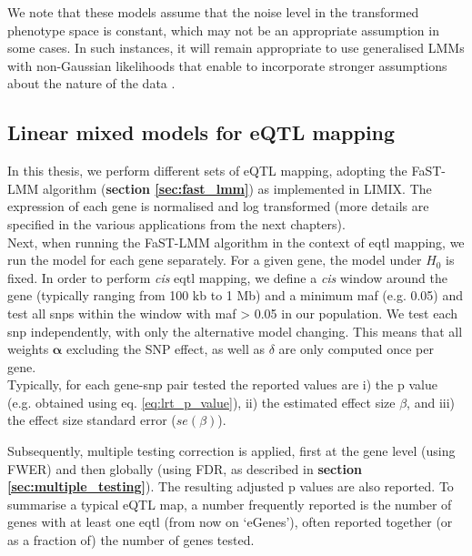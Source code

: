 We note that these models assume that the noise level in the transformed phenotype space is constant, which may not be an appropriate assumption in some cases. 
In such instances, it will remain appropriate to use generalised LMMs with non-Gaussian likelihoods that enable to incorporate stronger assumptions about the nature of the data \cite{fusi2014warped, lee2011estimating}. 

\subsection{Linear mixed models for eQTL mapping}
\label{sec:lmm_eqtl}

In this thesis, we perform different sets of eQTL mapping, adopting the FaST-LMM algorithm (\textbf{section \ref{sec:fast_lmm}}) as implemented in LIMIX.
The expression of each gene is normalised and log transformed (more details are specified in the various applications from the next chapters). \\

Next, when running the FaST-LMM algorithm in the context of \gls{eqtl} mapping, we run the model for each gene separately.
For a given gene, the model under $H_0$ is fixed.
In order to perform \textit{cis} \gls{eqtl} mapping, we define a \textit{cis} window around the gene (typically ranging from 100 kb to 1 Mb) and a minimum \gls{maf} (e.g. 0.05) and test all \gls{snp}s within the window with \gls{maf} > 0.05 in our population.  
We test each \gls{snp} independently, with only the alternative model changing.
This means that all weights $\boldsymbol{\alpha}$ excluding the SNP effect, as well as $\delta$ are only computed once per gene.\\

Typically, for each gene-\gls{snp} pair tested the reported values are i) the p value (e.g. obtained using eq. \eqref{eq:lrt_p_value}), ii) the estimated effect size $\beta$, and iii) the effect size standard error ($se(\beta)$).


Subsequently, multiple testing correction is applied, first at the gene level (using FWER) and then globally (using FDR, as described in \textbf{section \ref{sec:multiple_testing}}).
The resulting adjusted p values are also reported.
To summarise a typical eQTL map, a number frequently reported is the number of genes with at least one \gls{eqtl} (from now on `eGenes'), often reported together (or as a fraction of) the number of genes tested. 

